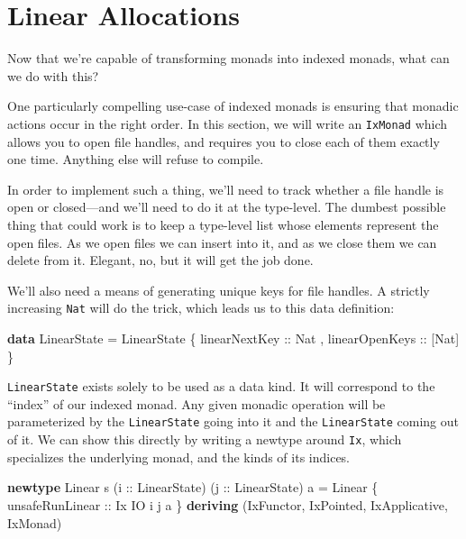 \documentclass[
  11pt,
]{book}
\newenvironment{Shaded}{}{}
\newcommand{\DataTypeTok}[1]{\textcolor[rgb]{0.56,0.13,0.00}{#1}}
\newcommand{\KeywordTok}[1]{\textcolor[rgb]{0.00,0.44,0.13}{\textbf{#1}}}
\newcommand{\NormalTok}[1]{#1}
\newcommand{\OtherTok}[1]{\textcolor[rgb]{0.00,0.44,0.13}{#1}}
\theoremstyle{nonumberplain}
\begin{document}
\hypertarget{linear-allocations}{%
\section{Linear Allocations}\label{linear-allocations}}

Now that we're capable of transforming monads into indexed monads, what
can we do with this?

One particularly compelling use-case of indexed monads is ensuring that
monadic actions occur in the right order. In this section, we will write
an \texttt{IxMonad} which allows you to open file handles, and requires
you to close each of them exactly one time. Anything else will refuse to
compile.

In order to implement such a thing, we'll need to track whether a file
handle is open or closed---and we'll need to do it at the type-level.
The dumbest possible thing that could work is to keep a type-level list
whose elements represent the open files. As we open files we can insert
into it, and as we close them we can delete from it. Elegant, no, but it
will get the job done.

We'll also need a means of generating unique keys for file handles. A
strictly increasing \texttt{Nat} will do the trick, which leads us to
this data definition:

\begin{Shaded}
\begin{Highlighting}[]
\KeywordTok{data} \DataTypeTok{LinearState} \OtherTok{=} \DataTypeTok{LinearState}
\NormalTok{  \{}\OtherTok{ linearNextKey  ::} \DataTypeTok{Nat}
\NormalTok{  ,}\OtherTok{ linearOpenKeys ::}\NormalTok{ [}\DataTypeTok{Nat}\NormalTok{]}
\NormalTok{  \}}
\end{Highlighting}
\end{Shaded}

\texttt{LinearState} exists solely to be used as a data kind. It will
correspond to the ``index'' of our indexed monad. Any given monadic
operation will be parameterized by the \texttt{LinearState} going into
it and the \texttt{LinearState} coming out of it. We can show this
directly by writing a newtype around \texttt{Ix}, which specializes the
underlying monad, and the kinds of its indices.

\begin{Shaded}
\begin{Highlighting}[]
\KeywordTok{newtype} \DataTypeTok{Linear}\NormalTok{ s (}\OtherTok{i ::} \DataTypeTok{LinearState}\NormalTok{)}
\NormalTok{                 (}\OtherTok{j ::} \DataTypeTok{LinearState}\NormalTok{) a }\OtherTok{=} \DataTypeTok{Linear}
\NormalTok{  \{}\OtherTok{ unsafeRunLinear ::} \DataTypeTok{Ix} \DataTypeTok{IO}\NormalTok{ i j a}
\NormalTok{  \}}
  \KeywordTok{deriving}\NormalTok{ (}\DataTypeTok{IxFunctor}\NormalTok{, }\DataTypeTok{IxPointed}\NormalTok{, }\DataTypeTok{IxApplicative}\NormalTok{, }\DataTypeTok{IxMonad}\NormalTok{)}
\end{Highlighting}
\end{Shaded}
\end{document}
